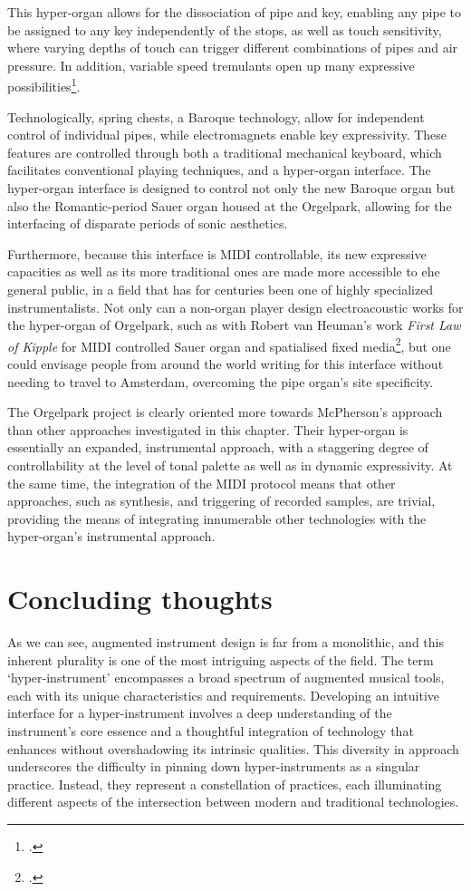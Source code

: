\documentclass[12pt,twoside,maitrise]{dms_ks}
\theoremstyle{definition}
\begin{document}
{This hyper-organ allows for the dissociation of pipe and key, enabling any pipe to be assigned to any key independently of the stops, as well as touch sensitivity, where varying depths of touch can trigger different combinations of pipes and air pressure.
In addition, variable speed tremulants open up many expressive possibilities\footcite[19--29]{fidom_digital_2020}.

Technologically, spring chests, a Baroque technology, allow for independent control of individual pipes, while electromagnets enable key expressivity. 
These features are controlled through both a traditional mechanical keyboard, which facilitates conventional playing techniques, and a hyper-organ interface. 
The hyper-organ interface is designed to control not only the new Baroque organ but also the Romantic-period Sauer organ housed at the Orgelpark, allowing for the interfacing of disparate periods of sonic aesthetics. 

Furthermore, because this interface is MIDI controllable, its new expressive capacities as well as its more traditional ones are made more accessible to ehe general public, in a field that has for centuries been one of highly specialized instrumentalists. Not only can a non-organ player design electroacoustic works for the hyper-organ of Orgelpark, such as with Robert van Heuman's work \textit{First Law of Kipple} for MIDI controlled Sauer organ and spatialised fixed media\footcite[190]{van_heumen_new_2020}, but one could envisage people from around the world writing for this interface without needing to travel to Amsterdam, overcoming the pipe organ's site specificity.

The Orgelpark project is clearly oriented more towards McPherson's approach than other approaches investigated in this chapter.
Their hyper-organ is essentially an expanded, instrumental approach, with a staggering degree of controllability at the level of tonal palette as well as in dynamic expressivity.
At the same time, the integration of the MIDI protocol means that other approaches, such as synthesis, and triggering of recorded samples, are trivial, providing the means of integrating innumerable other technologies with the hyper-organ's instrumental approach.

\section{Concluding thoughts}

As we can see, augmented instrument design is far from a monolithic, and this inherent plurality is one of the most intriguing aspects of the field.
The term `hyper-instrument' encompasses a broad spectrum of augmented musical tools, each with its unique characteristics and requirements.
Developing an intuitive interface for a hyper-instrument involves a deep understanding of the instrument's core essence and a thoughtful integration of technology that enhances without overshadowing its intrinsic qualities.
This diversity in approach underscores the difficulty in pinning down hyper-instruments as a singular practice.
Instead, they represent a constellation of practices, each illuminating different aspects of the intersection between modern and traditional technologies.

}
\end{document}
